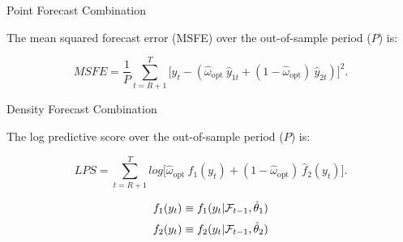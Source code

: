 \begin{frame}{Point Forecast Combination}

    The mean squared forecast error (MSFE) over the out-of-sample period ($P$) is:

    \begin{equation}
    \label{eqn:MSFE3}
    MSFE = \frac{1}{P} \sum^T_{t = R+1} \Big[y_t - (\hat{\omega}_{\text{opt}} \ \hat y_{1t} + (1-\hat{\omega}_{\text{opt}}) \ \hat y_{2t}) \Big]^2.
    \end{equation}

\end{frame}



\begin{frame}{Density Forecast Combination}

    The log predictive score over the out-of-sample period ($P$) is:

    \begin{equation}
    \label{eqn:LS3}
    LPS = \sum^T_{t = R+1} log \Big[ \hat{\omega}_{\text{opt}} \ \hat f_1(y_t) + (1- \hat{\omega}_{\text{opt}}) \ \hat f_2(y_t)\Big].
    \end{equation}

    \[f_1(y_t) \equiv f_1(y_t |\mathcal{F}_{\small{t-1}}, \hat\theta_1)\]
    \[f_2(y_t) \equiv f_2(y_t|\mathcal{F}_{\small{t-1}}, \hat\theta_2)\]

\end{frame}



